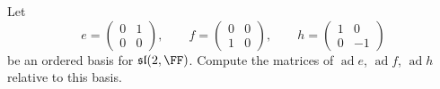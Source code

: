 \documentclass{article}
\DeclareMathOperator{\ad}{ad}
\newcommand{\slalg}{\ensuremath{\mathfrak{sl}}}
\begin{document}
\begin{exercise}[Humphreys 1.3]
    Let 
    \[
        e 
        = 
        \begin{pmatrix}
            0 & 1 \\
            0 & 0
        \end{pmatrix}
        ,\qquad
        f 
        = 
        \begin{pmatrix}
            0 & 0 \\
            1 & 0
        \end{pmatrix}
        ,\qquad
        h 
        = 
        \begin{pmatrix}
            1 & 0 \\
            0 & -1 
        \end{pmatrix}
    \]
    be an ordered basis for $\slalg(2, \FF)$.
    Compute the matrices of $\ad e$, $\ad f$, $\ad h$ relative to this basis.
\end{exercise}
\end{document}
